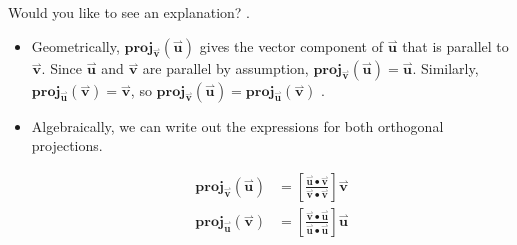 \documentclass{ximera}
\begin{document}
\begin{exercise}
\begin{selectAll}
\begin{hint}
\begin{problem}
Would you like to see an explanation?
.

\begin{question}
\begin{itemize}
\item Geometrically, $\mathbf{proj}_{\overset{\boldsymbol{\rightharpoonup}}{\mathbf{v}}}(\overset{\boldsymbol{\rightharpoonup}}{\mathbf{u}})$ gives the vector component of $\overset{\boldsymbol{\rightharpoonup}}{\mathbf{u}}$ that is parallel to $\overset{\boldsymbol{\rightharpoonup}}{\mathbf{v}}$.  Since $\overset{\boldsymbol{\rightharpoonup}}{\mathbf{u}}$ and $\overset{\boldsymbol{\rightharpoonup}}{\mathbf{v}}$ are parallel by assumption, $\mathbf{proj}_{\overset{\boldsymbol{\rightharpoonup}}{\mathbf{v}}}(\overset{\boldsymbol{\rightharpoonup}}{\mathbf{u}}) =\overset{\boldsymbol{\rightharpoonup}}{\mathbf{u}}$.  Similarly, $\mathbf{proj}_{\overset{\boldsymbol{\rightharpoonup}}{\mathbf{u}}}(\overset{\boldsymbol{\rightharpoonup}}{\mathbf{v}}) =\overset{\boldsymbol{\rightharpoonup}}{\mathbf{v}}$, so $\mathbf{proj}_{\overset{\boldsymbol{\rightharpoonup}}{\mathbf{v}}}(\overset{\boldsymbol{\rightharpoonup}}{\mathbf{u}}) = \mathbf{proj}_{\overset{\boldsymbol{\rightharpoonup}}{\mathbf{u}}}(\overset{\boldsymbol{\rightharpoonup}}{\mathbf{v}})$ .

\item Algebraically, we can write out the expressions for both orthogonal projections.

\begin{align*}
\mathbf{proj}_{\overset{\boldsymbol{\rightharpoonup}}{\mathbf{v}}}(\overset{\boldsymbol{\rightharpoonup}}{\mathbf{u}}) &= \left[\frac{\overset{\boldsymbol{\rightharpoonup}}{\mathbf{u}} \bullet \overset{\boldsymbol{\rightharpoonup}}{\mathbf{v}}}{\overset{\boldsymbol{\rightharpoonup}}{\mathbf{v}} \bullet \overset{\boldsymbol{\rightharpoonup}}{\mathbf{v}}}\right] \overset{\boldsymbol{\rightharpoonup}}{\mathbf{v}} \\
\mathbf{proj}_{\overset{\boldsymbol{\rightharpoonup}}{\mathbf{u}}}(\overset{\boldsymbol{\rightharpoonup}}{\mathbf{v}}) &= \left[\frac{\overset{\boldsymbol{\rightharpoonup}}{\mathbf{v}} \bullet \overset{\boldsymbol{\rightharpoonup}}{\mathbf{u}}}{\overset{\boldsymbol{\rightharpoonup}}{\mathbf{u}} \bullet \overset{\boldsymbol{\rightharpoonup}}{\mathbf{u}}}\right] \overset{\boldsymbol{\rightharpoonup}}{\mathbf{u}} \\
\end{align*}


\end{itemize}
\end{question}
\end{problem}
\end{hint}
\end{selectAll}
\end{exercise}
\end{document}
